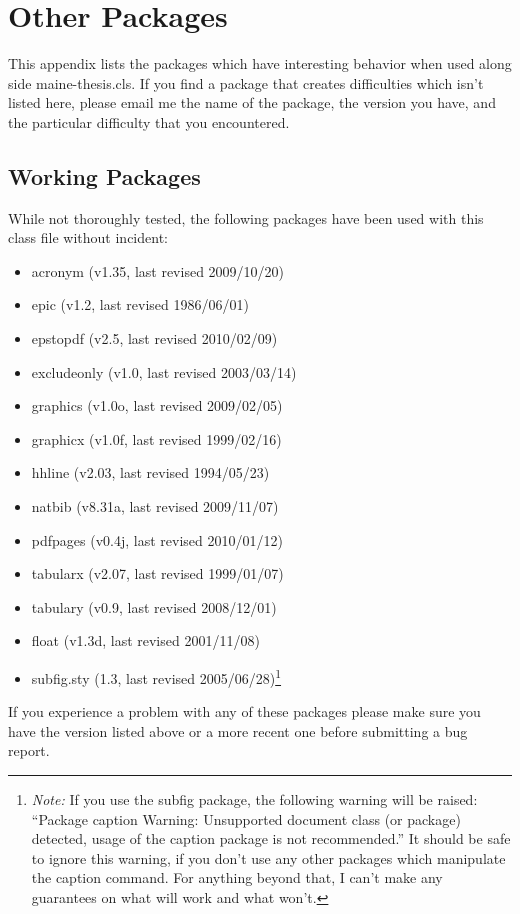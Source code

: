 \chapter{Other Packages}
\label{package}
This appendix lists the packages which have interesting behavior when used along side maine-thesis.cls.  If you find a package that creates difficulties which isn't listed here, please email me the name of the package, the version you have, and the particular difficulty that you encountered.

\section{Working Packages}
While not thoroughly tested, the following packages have been used with this class file without incident:
\begin{itemize}
\item{acronym (v1.35, last revised 2009/10/20)}
\item{epic (v1.2, last revised 1986/06/01)}
\item{epstopdf (v2.5, last revised 2010/02/09)}
\item{excludeonly (v1.0, last revised 2003/03/14)}
\item{graphics (v1.0o, last revised 2009/02/05)}
\item{graphicx (v1.0f, last revised 1999/02/16)}
\item{hhline (v2.03, last revised 1994/05/23)}
\item{natbib (v8.31a, last revised 2009/11/07)}
\item{pdfpages (v0.4j, last revised 2010/01/12)}
\item{tabularx (v2.07, last revised 1999/01/07)}
\item{tabulary (v0.9, last revised 2008/12/01)}
\item{float (v1.3d, last revised 2001/11/08)}
\item{subfig.sty (1.3, last revised 2005/06/28)\footnote{\emph{Note:} If you use the subfig package, the following warning will be raised: ``Package caption Warning: Unsupported document class (or package) detected, usage of the caption package is not recommended.''  It should be safe to ignore this warning, if you don't use any other packages which manipulate the caption command.  For anything beyond that, I can't make any guarantees on what will work and what won’t.}}
\end{itemize}
If you experience a problem with any of these packages please make sure you have the version listed above or a more recent one before submitting a bug report.

